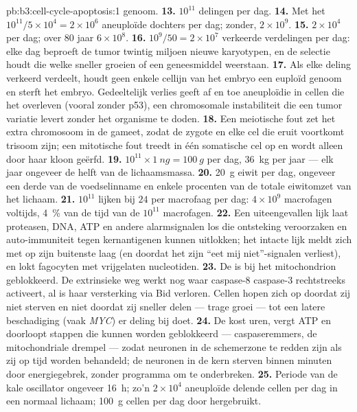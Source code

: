 \begin{solution}{pb:b3:cell-cycle-apoptosis:1}
genoom.
\textbf{13.} $10^{11}$ delingen per dag.
\textbf{14.} Met het  $10^{11}/5\times 10^{4} = 2\times 10^{6}$
aneuploïde dochters per dag; zonder, $2\times 10^{9}$.
\textbf{15.} $2\times 10^{4}$ per dag; over $80$ jaar $6\times 10^{8}$.
\textbf{16.} $10^{9}/50 = 2\times 10^{7}$ verkeerde verdelingen per dag:
elke dag beproeft de tumor twintig miljoen nieuwe karyotypen, en de
selectie houdt die welke sneller groeien of een geneesmiddel weerstaan.
\textbf{17.} Als elke deling verkeerd verdeelt, houdt geen enkele
cellijn van het embryo een euploïd genoom en sterft het embryo.
Gedeeltelijk verlies geeft af en toe aneuploïdie in cellen die het
overleven (vooral zonder p53), een chromosomale instabiliteit die een
tumor variatie levert zonder het organisme te doden.
\textbf{18.} Een meiotische fout zet het extra chromosoom in de gameet,
zodat de zygote en elke cel die eruit voortkomt trisoom zijn; een
mitotische fout treedt in één somatische cel op en wordt alleen door
haar kloon geërfd.
\textbf{19.} $10^{11}\times \qty{1}{ng} = \qty{100}{g}$ per dag,
\qty{36}{kg} per jaar --- elk jaar ongeveer de helft van de
lichaamsmassa.
\textbf{20.} \qty{20}{g} eiwit per dag, ongeveer een derde van de
voedselinname en enkele procenten van de totale eiwitomzet van het
lichaam.
\textbf{21.} $10^{11}$ lijken bij $24$ per macrofaag per dag: $4\times
10^{9}$ macrofagen voltijds, \qty{4}{\%} van de tijd van de $10^{11}$
macrofagen.
\textbf{22.} Een uiteengevallen lijk laat proteasen, DNA, ATP en andere
alarmsignalen los die ontsteking veroorzaken en auto-immuniteit tegen
kernantigenen kunnen uitlokken; het intacte lijk meldt zich met
 op zijn buitenste laag (en doordat het zijn ``eet mij
niet''-signalen verliest), en lokt fagocyten met vrijgelaten
nucleotiden.
\textbf{23.} De  is bij het mitochondrion geblokkeerd.
De extrinsieke weg werkt nog waar caspase-8 caspase-3 rechtstreeks
activeert, al is haar versterking via Bid verloren. Cellen hopen zich op
doordat zij niet sterven en niet doordat zij sneller delen --- trage
groei --- tot een latere beschadiging (vaak \emph{MYC}) er deling bij
doet.
\textbf{24.} De  kost uren, vergt ATP en doorloopt stappen die
kunnen worden geblokkeerd --- caspaseremmers, de mitochondriale drempel
--- zodat neuronen in de schemerzone te redden zijn als zij op tijd
worden behandeld; de neuronen in de kern sterven binnen minuten door
energiegebrek, zonder programma om te onderbreken.
\textbf{25.} Periode van de kale oscillator ongeveer \qty{16}{h}; zo'n $2\times
10^{4}$ aneuploïde delende cellen per dag in een normaal lichaam;
\qty{100}{g} cellen per dag door  hergebruikt.
\end{solution}
